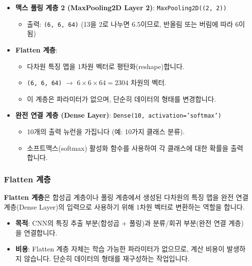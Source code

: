 \documentclass[11pt,a4paper]{article}
\begin{document}
\begin{examplebox}
\begin{itemize}
\begin{itemize}
            \item 출력: \texttt{(13, 13, 64)}
        \end{itemize}
    \item \textbf{맥스 풀링 계층 2 (MaxPooling2D Layer 2)}: \texttt{MaxPooling2D((2, 2))}
        \begin{itemize}
            \item 출력: \texttt{(6, 6, 64)} (13을 2로 나누면 6.5이므로, 반올림 또는 버림에 따라 6이 됨)
        \end{itemize}
    \item \textbf{Flatten 계층}:
        \begin{itemize}
            \item 다차원 특징 맵을 1차원 벡터로 평탄화(reshape)합니다.
            \item \texttt{(6, 6, 64)} $\rightarrow$ $6 \times 6 \times 64 = 2304$ 차원의 벡터.
            \item 이 계층은 파라미터가 없으며, 단순히 데이터의 형태를 변경합니다.
        \end{itemize}
    \item \textbf{완전 연결 계층 (Dense Layer)}: \texttt{Dense(10, activation='softmax')}
        \begin{itemize}
            \item 10개의 출력 뉴런을 가집니다 (예: 10가지 클래스 분류).
            \item 소프트맥스(softmax) 활성화 함수를 사용하여 각 클래스에 대한 확률을 출력합니다.
        \end{itemize}
\end{itemize}
\end{examplebox}

\subsubsection{Flatten 계층}
\begin{conceptbox}
\textbf{Flatten 계층}은 합성곱 계층이나 풀링 계층에서 생성된 다차원의 특징 맵을 완전 연결 계층(Dense Layer)의 입력으로 사용하기 위해 1차원 벡터로 변환하는 역할을 합니다.
\end{conceptbox}
\begin{itemize}
    \item \textbf{목적}: CNN의 특징 추출 부분(합성곱 + 풀링)과 분류/회귀 부분(완전 연결 계층)을 연결합니다.
    \item \textbf{비용}: Flatten 계층 자체는 학습 가능한 파라미터가 없으므로, 계산 비용이 발생하지 않습니다. 단순히 데이터의 형태를 재구성하는 작업입니다.
\end{itemize}
\end{document}
